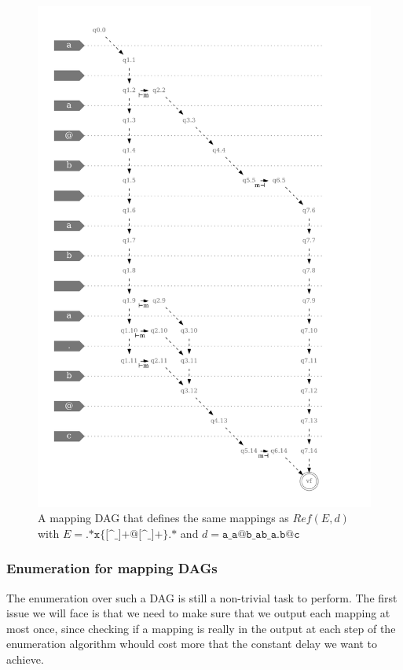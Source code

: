 \documentclass[12px]{article}
\theoremstyle{definition}
\begin{document}
        \begin{figure}
          \caption{%
            A mapping DAG that defines the same mappings as $Ref(E, d)$ with $E
            = \texttt{.*x\{[\textasciicircum\_]+@[\textasciicircum\_]+\}.*}$
            and $d = \texttt{a\_a@b\_ab\_a.b@c}$
          }
          \center\includegraphics[width=5in]{figures/example_dag}
        \end{figure}

      \subsubsection{Enumeration for mapping DAGs}

        The enumeration over such a DAG is still a non-trivial task to perform.
        The first issue we will face is that we need to make sure that we
        output each mapping at most once, since checking if a mapping is really
        in the output at each step of the enumeration algorithm whould cost
        more that the constant delay we want to achieve.
\end{document}
